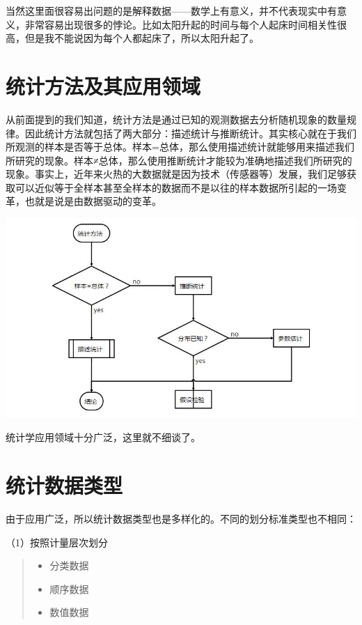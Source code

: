 \documentclass[]{ctexbook}
\providecommand{\tightlist}{%
  \setlength{\itemsep}{0pt}\setlength{\parskip}{0pt}}
\begin{document}
当然这里面很容易出问题的是解释数据------数学上有意义，并不代表现实中有意义，非常容易出现很多的悖论。比如太阳升起的时间与每个人起床时间相关性很高，但是我不能说因为每个人都起床了，所以太阳升起了。

\hypertarget{ux7edfux8ba1ux65b9ux6cd5ux53caux5176ux5e94ux7528ux9886ux57df}{%
\section{统计方法及其应用领域}\label{ux7edfux8ba1ux65b9ux6cd5ux53caux5176ux5e94ux7528ux9886ux57df}}

从前面提到的我们知道，统计方法是通过已知的观测数据去分析随机现象的数量规律。因此统计方法就包括了两大部分：描述统计与推断统计。其实核心就在于我们所观测的样本是否等于总体。样本=总体，那么使用描述统计就能够用来描述我们所研究的现象。样本≠总体，那么使用推断统计才能较为准确地描述我们所研究的现象。事实上，近年来火热的大数据就是因为技术（传感器等）发展，我们足够获取可以近似等于全样本甚至全样本的数据而不是以往的样本数据所引起的一场变革，也就是说是由数据驱动的变革。

\includegraphics[width=1\linewidth,height=0.45\textheight]{fig/fig3}

统计学应用领域十分广泛，这里就不细谈了。

\hypertarget{ux7edfux8ba1ux6570ux636eux7c7bux578b}{%
\section{统计数据类型}\label{ux7edfux8ba1ux6570ux636eux7c7bux578b}}

由于应用广泛，所以统计数据类型也是多样化的。不同的划分标准类型也不相同：

（1）按照计量层次划分

\begin{quote}
\begin{itemize}
\tightlist
\item
  分类数据
\item
  顺序数据
\item
  数值数据
\end{itemize}
\end{quote}
\end{document}
